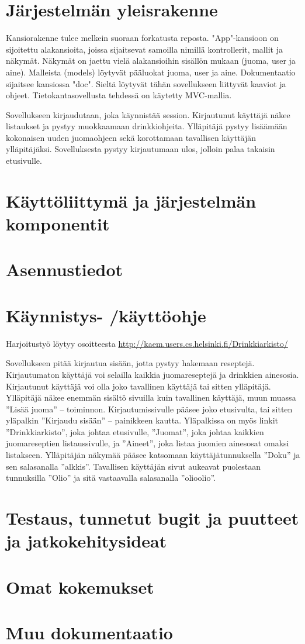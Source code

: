 \documentclass[a4paper]{article}
\begin{document}
\section{Järjestelmän yleisrakenne}

Kansiorakenne tulee melkein suoraan forkatusta reposta. "App"-kansioon on sijoitettu alakansioita, 
joissa sijaitsevat samoilla nimillä kontrollerit, mallit ja näkymät. Näkymät on jaettu vielä alakansioihin 
sisällön mukaan (juoma, user ja aine). Malleista (models) löytyvät pääluokat juoma, user ja aine. Dokumentaatio 
sijaitsee kansiossa "doc". Sieltä löytyvät tähän sovellukseen liittyvät kaaviot ja ohjeet. Tietokantasovellusta
tehdessä on käytetty MVC-mallia. 

Sovellukseen kirjaudutaan, joka käynnistää session. Kirjautunut käyttäjä näkee listaukset ja pystyy muokkaamaan 
drinkkiohjeita. Ylläpitäjä pystyy lisäämään kokonaisen uuden juomaohjeen sekä korottamaan tavallisen käyttäjän 
ylläpitäjäksi. Sovelluksesta pystyy kirjautumaan ulos, jolloin palaa takaisin etusivulle. 

\section{Käyttöliittymä ja järjestelmän komponentit}
\section{Asennustiedot}
\section{Käynnistys- /käyttöohje}
Harjoitustyö löytyy osoitteesta \url{http://kaem.users.cs.helsinki.fi/Drinkkiarkisto/}

Sovellukseen pitää kirjautua sisään, jotta pystyy hakemaan reseptejä. Kirjautumaton käyttäjä voi selailla
kaikkia juomareseptejä ja drinkkien ainesosia. Kirjautunut käyttäjä voi olla joko tavallinen käyttäjä tai sitten
ylläpitäjä. Ylläpitäjä näkee enemmän sisältö sivuilla kuin tavallinen käyttäjä, muun muassa ”Lisää juoma” –
toiminnon. Kirjautumissivulle pääsee joko etusivulta, tai sitten yläpalkin ”Kirjaudu sisään” – painikkeen
kautta. Yläpalkissa on myös linkit ”Drinkkiarkisto”, joka johtaa etusivulle, ”Juomat”, joka johtaa kaikkien
juomareseptien listaussivulle, ja ”Aineet”, joka listaa juomien ainesosat omaksi listakseen.
Ylläpitäjän näkymää pääsee katsomaan käyttäjätunnuksella ”Doku” ja sen salasanalla ”alkkis”. Tavallisen
käyttäjän sivut aukeavat puolestaan tunnuksilla ”Olio” ja sitä vastaavalla salasanalla ”olioolio”.

\section{Testaus, tunnetut bugit ja puutteet ja jatkokehitysideat}
\section{Omat kokemukset}
\section{Muu dokumentaatio}
\end{document}
